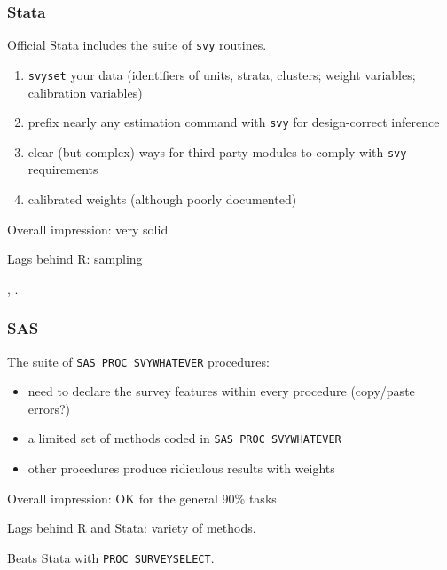 \documentclass{beamer}
\begin{document}
\begin{frame}\frametitle{Stata}

Official Stata includes the suite of \texttt{svy} routines.

\begin{enumerate}
    \item \texttt{svyset} your data (identifiers of units, strata, clusters; weight variables; calibration variables)
    \item prefix nearly any estimation command with \texttt{svy} for design-correct inference
    \item clear (but complex) ways for third-party modules to comply with \texttt{svy} requirements
    \item calibrated weights (although poorly documented)
\end{enumerate}

Overall impression: very solid

Lags behind R: sampling

\medskip

\citet{heeringa:west:berglund:2017}, \citet{kolenikov:pitblado:2014}.

\end{frame}

\begin{frame}\frametitle{SAS}


The suite of \texttt{SAS PROC SVYWHATEVER} procedures:

\begin{itemize}
    \item need to declare the survey features within every procedure (copy/paste errors?)
    \item a limited set of methods coded in \texttt{SAS PROC SVYWHATEVER}
    \item other procedures produce ridiculous results with weights
\end{itemize}

\bigskip

Overall impression: OK for the general 90\% tasks

\bigskip

Lags behind R and Stata: variety of methods.

\medskip

Beats Stata with \texttt{PROC SURVEYSELECT}.

\end{frame}
\end{document}
